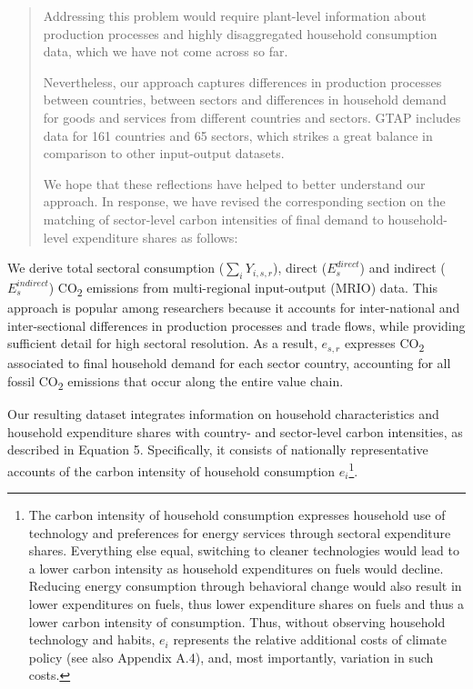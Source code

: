 \documentclass[11pt]{article}
\newenvironment{response}
{\begin{quote}\color{black}}
{\end{quote}}
\begin{document}
    \begin{response}

    Addressing this problem would require plant-level information about production processes and highly disaggregated household consumption data, which we have not come across so far.
    
    Nevertheless, our approach captures differences in production processes between countries, between sectors and differences in household demand for goods and services from different countries and sectors. GTAP includes data for 161 countries and 65 sectors, which strikes a great balance in comparison to other input-output datasets.

    We hope that these reflections have helped to better understand our approach. In response, we have revised the corresponding section on the matching of sector-level carbon intensities of final demand to household-level expenditure shares as follows:
    
\end{response}

\begin{revisionbox}
    We derive total sectoral consumption ($\sum_{i} Y_{i,s,r}$), direct ($E_{s}^{direct}$) and indirect ($E_{s}^{indirect}$) CO\textsubscript{2} emissions from  multi-regional input-output (MRIO) data. This approach is popular among researchers because it accounts for inter-national and inter-sectional differences in production processes and trade flows, while providing sufficient detail for high sectoral resolution. As a result, $e_{s,r}$ expresses CO\textsubscript{2} associated to final household demand for each sector country, accounting for all fossil CO\textsubscript{2} emissions that occur along the entire value chain.
\end{revisionbox}

\begin{revisionbox}
    Our resulting dataset integrates information on household characteristics and household expenditure shares with country- and sector-level carbon intensities, as described in Equation 5. Specifically, it consists of nationally representative accounts of the carbon intensity of household consumption $e_{i}$\footnote{The carbon intensity of household consumption expresses household use of technology and preferences for energy services through sectoral expenditure shares. Everything else equal, switching to cleaner technologies would lead to a lower carbon intensity as household expenditures on fuels would decline. Reducing energy consumption through behavioral change would also result in lower expenditures on fuels, thus lower expenditure shares on fuels and thus a lower carbon intensity of consumption. Thus, without observing household technology and habits, $e_{i}$ represents the relative additional costs of climate policy (see also Appendix A.4), and, most importantly, variation in such costs.}.
\end{revisionbox}
\end{document}
